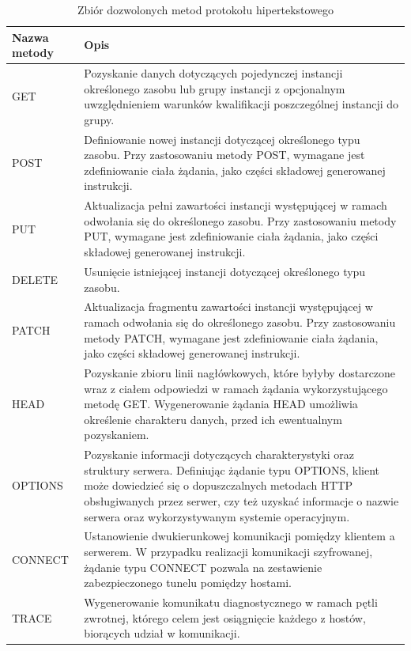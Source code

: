 \begin{longtable}{|l|p{12cm}|}
    \caption{Zbiór dozwolonych metod protokołu hipertekstowego}
    \label{tab:metody-http} \\
    \hline
    Nazwa metody & Opis \\ \hline\hline
    \endhead
    GET &
      Pozyskanie danych dotyczących pojedynczej instancji określonego zasobu lub grupy instancji z opcjonalnym uwzględnieniem warunków kwalifikacji poszczególnej instancji do grupy. \\ \hline
    POST &
      Definiowanie nowej instancji dotyczącej określonego typu zasobu. Przy zastosowaniu metody POST, wymagane jest zdefiniowanie ciała żądania, jako części składowej generowanej instrukcji. \\ \hline
    PUT &
      Aktualizacja pełni zawartości instancji występującej w ramach odwołania się do określonego zasobu. Przy zastosowaniu metody PUT, wymagane jest zdefiniowanie ciała żądania, jako części składowej generowanej instrukcji. \\ \hline
    DELETE &
      Usunięcie istniejącej instancji dotyczącej określonego typu zasobu. \\ \hline
    PATCH &
      Aktualizacja fragmentu zawartości instancji występującej w ramach odwołania się do określonego zasobu. Przy zastosowaniu metody PATCH, wymagane jest zdefiniowanie ciała żądania, jako części składowej generowanej instrukcji. \\ \hline
    HEAD &
      Pozyskanie zbioru linii nagłówkowych, które byłyby dostarczone wraz z ciałem odpowiedzi w ramach żądania wykorzystującego metodę GET. Wygenerowanie żądania HEAD umożliwia określenie charakteru danych, przed ich ewentualnym pozyskaniem. \\ \hline
    OPTIONS &
      Pozyskanie informacji dotyczących charakterystyki oraz struktury serwera. Definiując żądanie typu OPTIONS, klient może dowiedzieć się o dopuszczalnych metodach HTTP obsługiwanych przez serwer, czy też uzyskać informacje o nazwie serwera oraz wykorzystywanym systemie operacyjnym. \\ \hline
    CONNECT &
      Ustanowienie dwukierunkowej komunikacji pomiędzy klientem a serwerem. W przypadku realizacji komunikacji szyfrowanej, żądanie typu CONNECT pozwala na zestawienie zabezpieczonego tunelu pomiędzy hostami. \\ \hline
    TRACE &
      Wygenerowanie komunikatu diagnostycznego w ramach pętli zwrotnej, którego celem jest osiągnięcie każdego z hostów, biorących udział w komunikacji. \\ \hline
\end{longtable}

